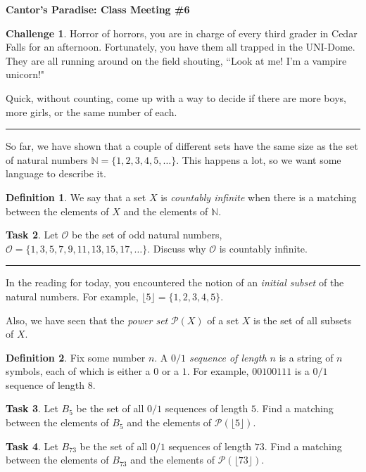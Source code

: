 \documentclass[12pt]{amsart}
\theoremstyle{definition}
\newtheorem{task}{Task}
\newtheorem{challenge}[task]{Challenge}
\newtheorem*{definition}{Definition}
\begin{document}
\begin{center}
\textbf{\Huge
Cantor's Paradise: Class Meeting \#6
}
\end{center}


\vspace{.5in}

\begin{challenge}
Horror of horrors, you are in charge of every third grader in Cedar Falls for an afternoon.
Fortunately, you have them all trapped in the UNI-Dome.
They are all running around on the field shouting, ``Look at me! I'm a vampire unicorn!"

Quick, without counting, come up with a way to decide if there are more boys, more girls, or the same number of each.
\end{challenge}

\vspace{.1in}
\hrule
\vspace{.1in}

So far, we have shown that a couple of different sets have the same size as the set of natural numbers $\mathbb{N} = \{1, 2, 3, 4, 5, \dots\}$.
This happens a lot, so we want some language to describe it.

\begin{definition}
We say that a set $X$ is \emph{countably infinite} when there is a matching between the elements of $X$ and the elements of $\mathbb{N}$.
\end{definition}

\begin{task} Let $\mathcal{O}$ be the set of odd natural numbers,
$\mathcal{O} = \{ 1, 3, 5, 7, 9, 11, 13, 15, 17, \dots\}$.
Discuss why $\mathcal{O}$ is countably infinite.
\end{task}

\vspace{.1in}
\hrule
\vspace{.1in}

In the reading for today, you encountered the notion of an \emph{initial subset} of the natural numbers.
For example, $\lfloor 5 \rfloor = \{1, 2, 3, 4, 5\}$.

Also, we have seen that the \emph{power set} $\mathcal{P}(X)$ of a set $X$ is the set of all subsets of $X$.

\begin{definition}
Fix some number $n$. A \emph{$0/1$ sequence of length $n$} is a string of $n$ symbols, each of which is either a $0$ or a $1$.
For example, $00100111$ is a $0/1$ sequence of length $8$.
\end{definition}

\begin{task}
Let $B_5$ be the set of all $0/1$ sequences of length $5$.
Find a matching between the elements of $B_5$ and the elements of $\mathcal{P}(\lfloor 5 \rfloor)$.
\end{task}

\begin{task}
Let $B_{73}$ be the set of all $0/1$ sequences of length $73$.
Find a matching between the elements of $B_{73}$ and the elements of $\mathcal{P}(\lfloor 73 \rfloor)$.
\end{task}
\end{document}
